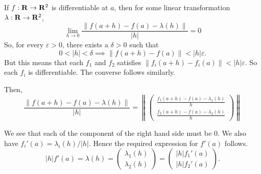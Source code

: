 \begin{solution}
    If $f:\mathbf{R}\to\mathbf{R}^2$ is differentiable
    at $a$, 
    then for some linear
    transformation $\lambda:\mathbf{R}\to\mathbf{R}^2$,
    $$\lim_{h\to 0}
    {\frac{\|f(a+h)-f(a)-\lambda(h)\|}
    {\vert h\vert}}
    =0$$
    So, for every $\varepsilon>0$, there
    exists a $\delta>0$ such that
    $$0<\vert h\vert <\delta\implies
    \|f(a+h)-f(a)\|<
    \vert h\vert\varepsilon.$$
    But this means that each $f_1$ and
    $f_2$ satisfies
    $\|f_i(a+h)-f_i(a)\|<\vert h\vert
    \varepsilon.$ So each $f_i$ is
    differentiable. The converse follows
    similarly.

    Then,
    $$\frac{\|f(a+h)-f(a)-\lambda(h)\|}
    {\vert h\vert}=\left\lVert\left(
        \begin{matrix}
        \frac{f_1(a+h)-f(a)-\lambda_1(h)}
        {h}\\
        \frac{f_2(a+h)-f(a)-\lambda_2(h)}
        {h}
        \end{matrix}\right)\right\rVert$$
    
    We see that each of the component
    of the right
    hand side must be $0$. We also have
    $f_i'(a)=\lambda_i(h)/\vert h\vert.$
    Hence the
    required expression for $f'(a)$
    follows.
    $$\vert h\vert f'(a)=
    \lambda(h) =
    \left(
    \begin{matrix}
        \lambda_1(h)\\
        \lambda_2(h)
    \end{matrix}\right)
    =
    \left(
    \begin{matrix}
        \vert h\vert f_1'(a)\\
        \vert h\vert f_2'(a)
    \end{matrix}\right).
    $$
\end{solution}